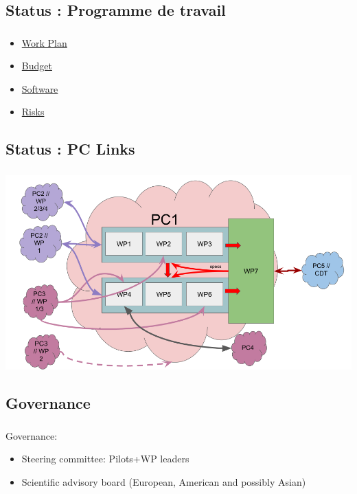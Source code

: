 \subsection{Status : Programme de travail}
\begin{frame}
  \frametitle{\insertsectionhead}
  \framesubtitle{\insertsubsectionhead}

  \begin{itemize}
    \item \href{https://docs.google.com/document/d/1hfqw5hm4sBfGVRh6Dqxda4H71u1vXIDB/edit#heading=h.4d34og8}{Work Plan}
    \item \href{https://docs.google.com/spreadsheets/d/1-IqdJ-nOYUK69B_jLoXCrkS9oxnMo54fElNP1DAZ08U/edit?usp=sharing}{Budget}
    \item \href{https://docs.google.com/spreadsheets/d/19v57jpek52nQV2V0tBBON5ivGCz7Bqf3Gw-fHroVHkA/edit?usp=sharing}{Software}
    \item \href{}{Risks}
  \end{itemize}

 \end{frame}

\subsection{Status : PC Links}

\begin{frame}
  \frametitle{\insertsectionhead}
  \framesubtitle{\insertsubsectionhead}
  \vspace{-.4cm}
  \includegraphics[width=.86\linewidth]{../../figures/exama-pc.png}

\end{frame}


\subsection{Governance}
\begin{frame}
  \frametitle{\insertsectionhead}
  \framesubtitle{\insertsubsectionhead}

Governance:
\begin{itemize}
  \item Steering committee: Pilots+WP leaders
  \item Scientific advisory board (European, American and possibly Asian)
\end{itemize}

\end{frame}

